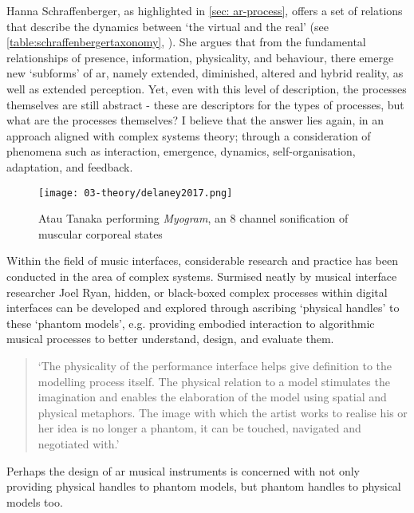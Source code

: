 Hanna Schraffenberger, as highlighted in \autoref{sec: ar-process}, offers a set of relations that describe the dynamics between `the virtual and the real' (see \autoref{table:schraffenbergertaxonomy}, \pageref{table:schraffenbergertaxonomy}). She argues that from the fundamental relationships of presence, information, physicality, and behaviour, there emerge new `subforms' of \gls{ar}, namely extended, diminished, altered and hybrid reality, as well as extended perception. Yet, even with this level of description, the processes themselves are still abstract - these are descriptors for the types of processes, but what are the processes themselves? I believe that the answer lies again, in an approach aligned with complex systems theory; through a consideration of phenomena such as interaction, emergence, dynamics, self-organisation, adaptation, and feedback.

\begin{wrapfigure}{r}{0.45\textwidth}
    \vspace{-\intextsep}
    \hfill
    \begin{minipage}{0.95\linewidth}
        \texttt{[image: 03-theory/delaney2017.png]}
        \captionsetup{justification=justified}
        \caption{Atau Tanaka performing \textit{Myogram}, an 8 channel sonification of muscular corporeal states \citep[taken by][]{delaney2017}}\label{fig: delaney2017}
    \end{minipage}
\end{wrapfigure}

Within the field of music interfaces, considerable research and practice has been conducted in the area of complex systems. Surmised neatly by musical interface researcher Joel Ryan, hidden, or black-boxed complex processes within digital interfaces can be developed and explored through ascribing `physical handles' to these `phantom models', e.g. providing embodied interaction to algorithmic musical processes to better understand, design, and evaluate them.
\begin{quote}
    `The physicality of the performance interface helps give definition to the modelling process itself. The physical relation to a model stimulates the imagination and enables the elaboration of the model using spatial and physical metaphors. The image with which the artist works to realise his or her idea is no longer a phantom, it can be touched, navigated and negotiated with.' \citeyearpar[p.5]{ryan1991}
\end{quote}
Perhaps the design of \gls{ar} musical instruments is concerned with not only providing physical handles to phantom models, but phantom handles to physical models too.

